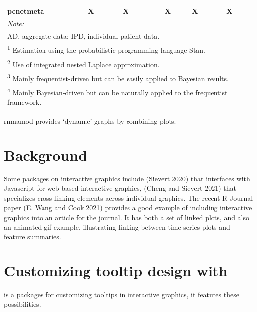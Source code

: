 \begin{table}
\begin{tabular}[t]{l|c|c|c|c|c|l|c|c|c|c}
\hline
pcnetmeta & X &  & X &  &  & X & X &  & X & \\
\hline
\multicolumn{11}{l}{\rule{0pt}{1em}\textit{Note: }}\\
\multicolumn{11}{l}{\rule{0pt}{1em}AD, aggregate data; IPD, individual patient data.}\\
\multicolumn{11}{l}{\rule{0pt}{1em}\textsuperscript{1} Estimation using the probabilistic programming language Stan.}\\
\multicolumn{11}{l}{\rule{0pt}{1em}\textsuperscript{2} Use of integrated nested Laplace approximation.}\\
\multicolumn{11}{l}{\rule{0pt}{1em}\textsuperscript{3} Mainly frequentist-driven but can be easily applied to Bayesian results.}\\
\multicolumn{11}{l}{\rule{0pt}{1em}\textsuperscript{4} Mainly Bayesian-driven but can be naturally applied to the frequentist framework.}\\
\end{tabular}
\end{table}

rnmamod provides `dynamic' graphs by combining plots.

\hypertarget{background}{%
\section{Background}\label{background}}

Some packages on interactive graphics include  (Sievert 2020) that interfaces with Javascript for web-based interactive graphics,  (Cheng and Sievert 2021) that specializes cross-linking elements across individual graphics. The recent R Journal paper  (E. Wang and Cook 2021) provides a good example of including interactive graphics into an article for the journal. It has both a set of linked plots, and also an animated gif example, illustrating linking between time series plots and feature summaries.

\hypertarget{customizing-tooltip-design-with}{%
\section{\texorpdfstring{Customizing tooltip design with }{Customizing tooltip design with }}\label{customizing-tooltip-design-with}}

 is a packages for customizing tooltips in interactive graphics, it features these possibilities.

